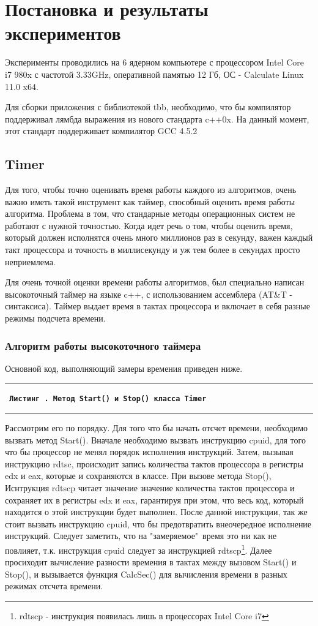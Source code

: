 \documentclass[12pt, a4paper]{article}
\newcommand{\HRule}{\noindent\rule{\linewidth}{0.45mm}}
\newcounter{sourcecode}
\newcommand*{\cppsource}[2]{\par{\HRule \small \tt \bf \noindent \ Листинг \arabic{sourcecode}. {\rm \small #2} \vspace{0.25cm}}%
\addtocounter{sourcecode}{1}  \HRule}
\begin{document}
\newpage
\section{Постановка и результаты экспериментов}

Эксперименты проводились на 6 ядерном компьютере с процессором Intel Core i7 980x с частотой 3.33GHz, оперативной памятью 12 Гб, ОС - Calculate Linux 11.0 x64. 

Для сборки приложения с библиотекой tbb, необходимо, что бы компилятор поддерживал лямбда выражения из нового стандарта c++0x. На данный момент, этот стандарт поддерживает компилятор GCC 4.5.2

\subsection{Timer}
Для того, чтобы точно оценивать время работы каждого из алгоритмов, очень важно иметь такой инструмент как таймер, способный оценить время работы алгоритма. 
Проблема в том, что стандарные методы операционных систем не работают с нужной точностью. Когда идет речь о том, чтобы оценить время, который должен исполнятся очень много миллионов раз в секунду, важен каждый такт процессора и точность в миллисекунду и уж тем более в секундах просто неприемлема.

Для очень точной оценки времени работы алгоритмов, был специально написан высокоточный таймер на языке c++, с использованием ассемблера (AT\&T - синтаксиса).
Таймер выдает время в тактах процессора и включает в себя разные режимы подсчета времени.


\subsubsection{Алгоритм работы высокоточного таймера}
Основной код, выполняющий замеры времения приведен ниже.
\cppsource{src/timer.tex}{Метод Start() и Stop() класса Timer}

Рассмотрим его по порядку. Для того что бы начать отсчет времени, необходимо вызвать метод Start(). 
Вначале необходимо вызвать инструкцию cpuid, для того что бы процессор не менял порядок исполнения инструкций. Затем, вызывая инструкцию rdtsc, происходит запись количества тактов процессора в регистры edx и eax, которые и сохраняются в классе.
При вызове метода Stop(), 
Иснтрукция rdtscp читает значение значение количества тактов процессора и сохраняет их в регистры edx и eax, гарантируя при этом, что весь код, который находится о этой инструкции будет выполнен. После данной инструкции, так же стоит вызвать инструкцию cpuid, что бы предотвратить внеочередное исполнение инструкций.
Следует заметить, что на "замеряемое"\ время это ни как не повлияет, т.к. инструкция cpuid следует за инструкцией rdtscp\footnote{rdtscp - инструкция появилась лишь в процессорах Intel Core i7}. Далее просиходит вычисление разности времения в тактах между вызовом Start() и Stop(), и вызывается функция CalcSec() для вычисления времени в разных режимах отсчета времени.
\end{document}
